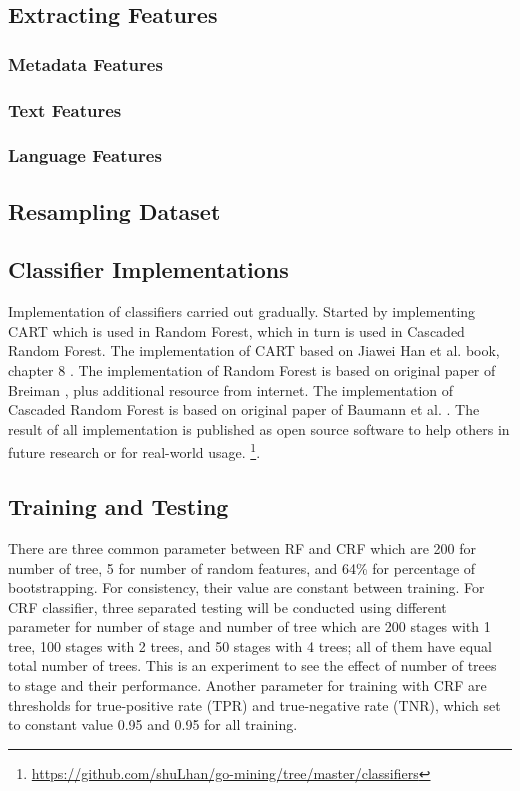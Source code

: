 \subsection{Extracting Features}
	

\subsubsection{Metadata Features}
	

\subsubsection{Text Features}
	

\subsubsection{Language Features}
	

\subsection{Resampling Dataset}
	


\subsection{Classifier Implementations}

Implementation of classifiers carried out gradually.
Started by implementing CART which is used in Random Forest, which in turn is
used in Cascaded Random Forest.
The implementation of CART based on Jiawei Han et al. book, chapter 8
\cite{han2011data}.
The implementation of Random Forest is based on original paper of Breiman
\cite{breiman2001random}, plus additional resource from internet.
The implementation of Cascaded Random Forest is based on original paper of
Baumann et al.
\cite{baumann2013cascaded}.
The result of all implementation is published as open source software to help
others in future research or for real-world usage.
\footnote{\url{https://github.com/shuLhan/go-mining/tree/master/classifiers}}.


\subsection{Training and Testing}

There are three common parameter between RF and CRF which are 200 for number of
tree, 5 for number of random features, and 64\% for percentage of
bootstrapping.
For consistency, their value are constant between training.
For CRF classifier, three separated testing will be conducted using different
parameter for number of stage and number of tree which are 200 stages with 1
tree, 100 stages with 2 trees, and 50 stages with 4 trees; all of them have
equal total number of trees.
This is an experiment to see the effect of number of trees to stage and their
performance.
Another parameter for training with CRF are thresholds for true-positive rate
(TPR) and true-negative rate (TNR), which set to constant value 0.95 and 0.95
for all training.

